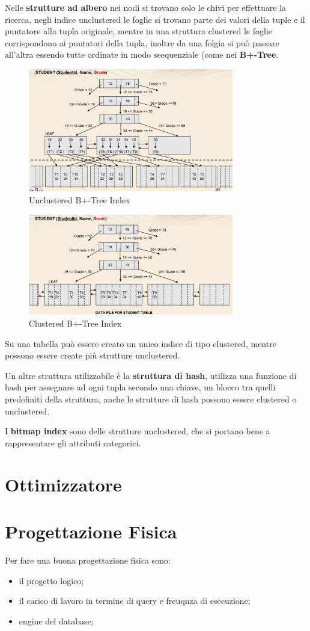 \documentclass[12pt]{article}
\begin{document}
Nelle \textbf{strutture ad albero} nei nodi si trovano solo le chivi per effettuare la ricerca, negli indice unclustered le foglie si trovano parte dei valori della tuple e il puntatore alla tupla originale, mentre in una struttura clustered le foglie corrispondono ai puntatori della tupla, inoltre da una folgia si pu\`o passare all'altra essendo tutte ordinate in modo seequenziale (come nei \textbf{B+-Tree}.
\begin{figure}[H]
    \centering
    \includegraphics[width=0.8\textwidth]{unclustered-b-tree.png}
    \caption{Unclustered B+-Tree Index}
    \label{fig:unclustered-b-tree}
\end{figure}
\begin{figure}[H]
    \centering
    \includegraphics[width=0.8\textwidth]{clustered-b-tree.png}
    \caption{Clustered B+-Tree Index}
    \label{fig:clustered-b-tree}
\end{figure}
Su una tabella pu\`o essere creato un unico indice di tipo clustered, mentre possono essere create pi\`u strutture unclustered.


Un altre struttura utilizzabile \`e la \textbf{struttura di hash}, utilizza una funzione di hash per assegnare ad ogni tupla secondo una chiave, un blocco tra quelli predefiniti della struttura, anche le strutture di hash possono essere clustered o unclustered.


I \textbf{bitmap index} sono delle strutture unclustered, che si portano bene a rappresentare gli attributi categorici.



\section{Ottimizzatore}



\section{Progettazione Fisica}
Per fare una buona progettazione fisica sono:
\begin{itemize}
    \item il progetto logico;
    \item il carico di lavoro in termine di query e freuqnza di esecuzione;
    \item engine del database;
\end{itemize}
\end{document}
